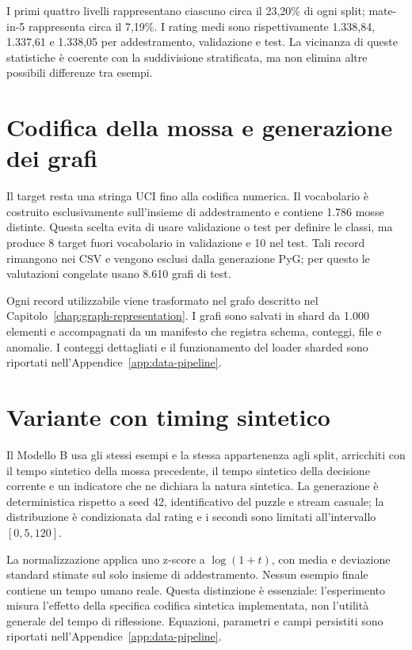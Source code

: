 I primi quattro livelli rappresentano ciascuno circa il 23,20\% di ogni split;
mate-in-5 rappresenta circa il 7,19\%. I rating medi sono rispettivamente
1.338,84, 1.337,61 e 1.338,05 per addestramento, validazione e test. La vicinanza
di queste statistiche è coerente con la suddivisione stratificata, ma non elimina
altre possibili differenze tra esempi.

\section{Codifica della mossa e generazione dei grafi}

Il target resta una stringa UCI fino alla codifica numerica. Il vocabolario è
costruito esclusivamente sull'insieme di addestramento e contiene 1.786 mosse
distinte. Questa scelta evita di usare validazione o test per definire le classi,
ma produce 8 target fuori vocabolario in validazione e 10 nel test. Tali record
rimangono nei CSV e vengono esclusi dalla generazione PyG; per questo le
valutazioni congelate usano 8.610 grafi di test.

Ogni record utilizzabile viene trasformato nel grafo descritto nel
Capitolo~\ref{chap:graph-representation}. I grafi sono salvati in shard da 1.000
elementi e accompagnati da un manifesto che registra schema, conteggi, file e
anomalie. I conteggi dettagliati e il funzionamento del loader sharded sono
riportati nell'Appendice~\ref{app:data-pipeline}.

\section{Variante con timing sintetico}
\label{sec:synthetic-timing}

Il Modello B usa gli stessi esempi e la stessa appartenenza agli split, arricchiti
con il tempo sintetico della mossa precedente, il tempo sintetico della decisione
corrente e un indicatore che ne dichiara la natura sintetica. La generazione è
deterministica rispetto a seed 42, identificativo del puzzle e stream casuale; la
distribuzione è condizionata dal rating e i secondi sono limitati all'intervallo
\([0{,}5,120]\).

La normalizzazione applica uno z-score a \(\log(1+t)\), con media e deviazione
standard stimate sul solo insieme di addestramento. Nessun esempio finale contiene
un tempo umano reale. Questa distinzione è essenziale: l'esperimento misura
l'effetto della specifica codifica sintetica implementata, non l'utilità generale
del tempo di riflessione. Equazioni, parametri e campi persistiti sono riportati
nell'Appendice~\ref{app:data-pipeline}.

